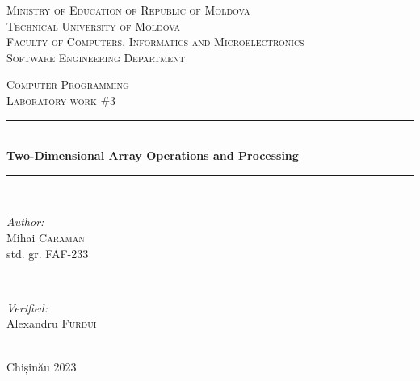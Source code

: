 \documentclass[12pt]{article}
\begin{document}
\begin{titlepage}
   \begin{center}
    \textsc{\large Ministry of Education of Republic of Moldova}\\[0.5cm]
    \textsc{\large Technical University of Moldova}\\[0.5cm]
    \textsc{\large Faculty of Computers, Informatics and Microelectronics}\\[0.5cm]
    \textsc{\large Software Engineering Department}\\[1.2cm]
    
    \vspace{25 mm}
    
    \textsc{\Large Computer Programming}\\[0.5cm]
    \textsc{\large Laboratory work \#3}\\[0.5cm]    %
    
    \newcommand{\HRule}{\rule{\linewidth}{0.5mm}}
    \vspace{10 mm}
    \HRule \\[0.4cm]
    { \LARGE \bfseries Two-Dimensional Array Operations and Processing }\\[0.4cm] %
    \HRule \\[1.5cm]
    
    \vspace{10mm}
    
    \begin{minipage}[t]{0.4\textwidth}
    \begin{flushleft} \large
    \emph{Author:} \\
    Mihai \textsc{Caraman}\\                         %
    std. gr. FAF-233                                %
    \end{flushleft}
    \end{minipage}
    ~
    \begin{minipage}[t]{0.4\textwidth}
    \begin{flushright} \large
    \emph{Verified:} \\
    Alexandru \textsc{Furdui}\\
    \end{flushright}
    \end{minipage}\\[3cm]
    
    \vspace{5 mm}
    \large Chișinău 2023\\[0.5cm]
    
    \vfill
    \end{center}
\end{titlepage}
\end{document}
